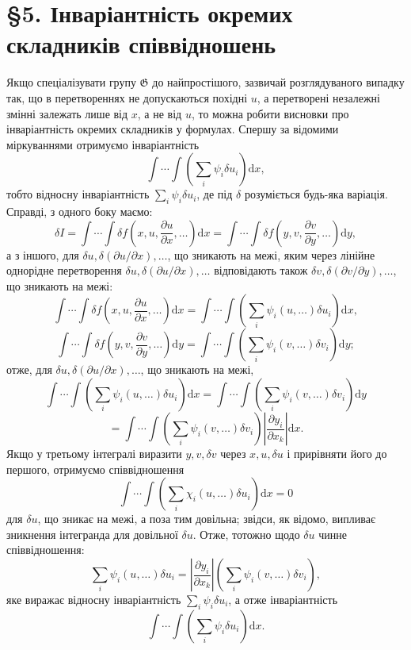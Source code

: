 \documentclass[11pt]{article}
\providecommand{\G}{\mathfrak G}
\providecommand{\p}{\partial}
\providecommand{\dd}{\mathrm d}
\begin{document}
\section*{\S{}5. Інваріантність окремих складників співвідношень}

Якщо спеціалізувати групу \(\G\) до найпростішого, зазвичай розглядуваного випадку так, що в перетвореннях не допускаються похідні \(u\), а перетворені незалежні змінні залежать лише від \(x\), а не від \(u\), то можна робити висновки про інваріантність окремих складників у формулах. Спершу за відомими міркуваннями отримуємо інваріантність
\[
\int\!\cdots\!\int\left(\sum_i\psi_i\delta u_i\right)\dd x,
\]
тобто відносну інваріантність \(\sum_i\psi_i\delta u_i\), де під \(\delta\) розуміється будь-яка варіація. Справді, з одного боку маємо:
\[
\delta I
=\int\!\cdots\!\int \delta f\!\left(x,u,\frac{\p u}{\p x},\ldots\right)\dd x
=\int\!\cdots\!\int \delta f\!\left(y,v,\frac{\p v}{\p y},\ldots\right)\dd y,
\]
а з іншого, для \(\delta u,\delta(\p u/\p x),\ldots\), що зникають на межі, яким через лінійне однорідне перетворення \(\delta u,\delta(\p u/\p x),\ldots\) відповідають також \(\delta v,\delta(\p v/\p y),\ldots\), що зникають на межі:
\[
\int\!\cdots\!\int \delta f\!\left(x,u,\frac{\p u}{\p x},\ldots\right)\dd x
=
\int\!\cdots\!\int\left(\sum_i\psi_i(u,\ldots)\delta u_i\right)\dd x,
\]
\[
\int\!\cdots\!\int \delta f\!\left(y,v,\frac{\p v}{\p y},\ldots\right)\dd y
=
\int\!\cdots\!\int\left(\sum_i\psi_i(v,\ldots)\delta v_i\right)\dd y;
\]
отже, для \(\delta u,\delta(\p u/\p x),\ldots\), що зникають на межі,
\[
\int\!\cdots\!\int\left(\sum_i\psi_i(u,\ldots)\delta u_i\right)\dd x
=
\int\!\cdots\!\int\left(\sum_i\psi_i(v,\ldots)\delta v_i\right)\dd y
\]
\[
=
\int\!\cdots\!\int\left(\sum_i\psi_i(v,\ldots)\delta v_i\right)
\left|\frac{\p y_i}{\p x_k}\right|\dd x.
\]
Якщо у третьому інтегралі виразити \(y,v,\delta v\) через \(x,u,\delta u\) і прирівняти його до першого, отримуємо співвідношення
\[
\int\!\cdots\!\int\left(\sum_i\chi_i(u,\ldots)\delta u_i\right)\dd x=0
\]
для \(\delta u\), що зникає на межі, а поза тим довільна; звідси, як відомо, випливає зникнення інтегранда для довільної \(\delta u\). Отже, тотожно щодо \(\delta u\) чинне співвідношення:
\[
\sum_i\psi_i(u,\ldots)\delta u_i
=
\left|\frac{\p y_i}{\p x_k}\right|
\left(\sum_i\psi_i(v,\ldots)\delta v_i\right),
\]
яке виражає відносну інваріантність \(\sum_i\psi_i\delta u_i\), а отже інваріантність
\[
\int\!\cdots\!\int\left(\sum_i\psi_i\delta u_i\right)\dd x.
\]
\end{document}

